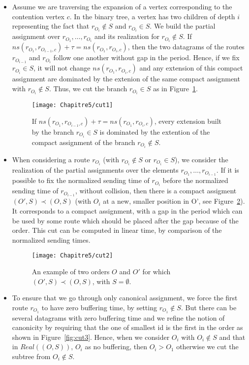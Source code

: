 \begin{itemize}
  \item 
  Assume we are traversing the expansion of a vertex corresponding to the contention vertex $c$.
  In the binary tree, a vertex has two children of depth $i$ representing the fact
  that $r_{O_i} \notin S$ and $r_{O_i} \in S$. We build the partial assignment over $r_{O_1},\dots,r_{O_i}$
  and its realization for $r_{O_i} \notin S$. If $ns(r_{O_1},r_{O_{i-1},c}) + \tau = ns(r_{O_1},r_{O_{i},c})$, then
  the two datagrams of the routes $r_{O_{i-1}}$ and $r_{O_{i}}$ follow one another without gap in the period.
  Hence, if we fix $r_{O_i} \in S$, it will not change $ns(r_{O_1},r_{O_{i},c})$ and any extension of this compact assignment are dominated by the extenion of the same compact assignment with $r_{O_i} \notin S$.
  Thus, we cut the branch $r_{O_i} \in S$ as in Figure~\ref{fig:cut1}.
  \begin{center}

\begin{figure}[h]
  \centering
\texttt{[image: Chapitre5/cut1]}
\caption{ If $ns(r_{O_1},r_{O_{i-1},c}) + \tau = ns(r_{O_1},r_{O_{i},c})$, every extension built by the branch $r_{O_i} \in S$ is dominated by the extention of the compact assignment of the branch $r_{O_i} \notin S$.}
\label{fig:cut1}
\end{figure}
\end{center}
  \item When considering a route $r_{O_i}$ (with $r_{O_i} \notin S$ or $r_{O_i} \in S$), we consider
  the realization of the partial assignments over the elements $r_{O_1},\dots,r_{O_{i-1}}$. If it is possible
  to fix the normalized sending time of $r_{O_i}$ before the normalized sending time of $r_{O_{i-1}}$, without collision,
  then there is a compact assigment $(O',S) \prec (O,S)$ (with $O_i$ at a new, smaller position in O', see Figure~\ref{fig:cut2}). It corresponds to
  a compact assignment, with a gap in the period which can be used by some route which should be placed after the gap because of the order. This cut can be computed in linear time, by comparison of the normalized sending times.
  \begin{center}

\begin{figure}[h]
  \centering
\texttt{[image: Chapitre5/cut2]}
\caption{ An example of two orders $O$ and $O'$ for which $(O',S) \prec (O,S)$, with $S = \emptyset$.}
\label{fig:cut2}
\end{figure}
\end{center}
  \item To ensure that we go through only canonical assignment, we force the first route $r_{O_1}$ to 
  have zero buffering time, by setting $r_{O_1} \notin S$. But there can be several datagrams with zero 
  buffering time and we refine the notion of canonicity by requiring that the one of smallest id is the
  first in the order as shown in Figure~\ref{fig:cut3}. Hence, when we consider $O_i$ with $O_i \notin S$ and that in $Real((O,S))$, 
  $O_i$ as no buffering, then $O_i > O_1$ otherwise we cut the subtree from $O_i \notin S$.
  \begin{center}


\end{center}
\end{itemize}
